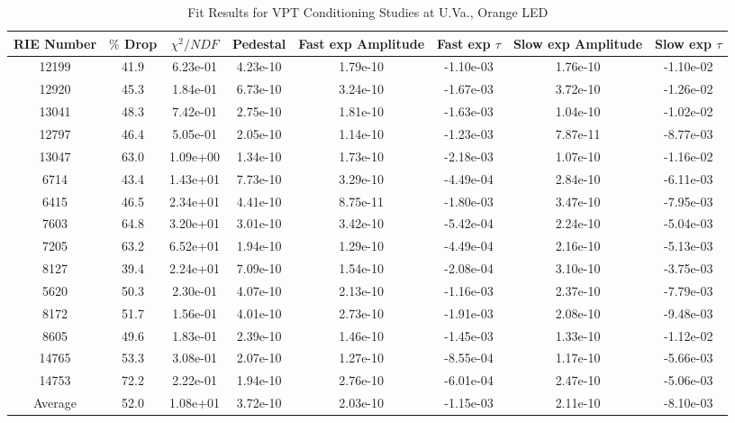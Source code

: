 \begin{table}[ht] 
\begin{adjustwidth}{-1.7in}{-1.7in} 
  \centering 
  \noindent 
  \small 
    \caption{Fit Results for VPT Conditioning Studies at U.Va., Orange LED} 
    \label{tab:UVaRig_orange} 
    \begin{tabular}{|c|c|c|c|c|c|c|c|} \hline 
RIE Number & $\%$ Drop & $\chi^2/NDF$ & Pedestal & Fast exp Amplitude &  Fast exp $\tau$  & Slow exp Amplitude &  Slow exp $\tau$   \\ \hline 
 
12199  & 41.9 & 6.23e-01 & 4.23e-10 & 1.79e-10 & -1.10e-03 & 1.76e-10 & -1.10e-02\\ \hline 
12920  & 45.3 & 1.84e-01 & 6.73e-10 & 3.24e-10 & -1.67e-03 & 3.72e-10 & -1.26e-02\\ \hline 
13041  & 48.3 & 7.42e-01 & 2.75e-10 & 1.81e-10 & -1.63e-03 & 1.04e-10 & -1.02e-02\\ \hline 
12797  & 46.4 & 5.05e-01 & 2.05e-10 & 1.14e-10 & -1.23e-03 & 7.87e-11 & -8.77e-03\\ \hline 
13047  & 63.0 & 1.09e+00 & 1.34e-10 & 1.73e-10 & -2.18e-03 & 1.07e-10 & -1.16e-02\\ \hline 
6714  & 43.4 & 1.43e+01 & 7.73e-10 & 3.29e-10 & -4.49e-04 & 2.84e-10 & -6.11e-03\\ \hline 
6415  & 46.5 & 2.34e+01 & 4.41e-10 & 8.75e-11 & -1.80e-03 & 3.47e-10 & -7.95e-03\\ \hline 
7603  & 64.8 & 3.20e+01 & 3.01e-10 & 3.42e-10 & -5.42e-04 & 2.24e-10 & -5.04e-03\\ \hline 
7205  & 63.2 & 6.52e+01 & 1.94e-10 & 1.29e-10 & -4.49e-04 & 2.16e-10 & -5.13e-03\\ \hline 
8127  & 39.4 & 2.24e+01 & 7.09e-10 & 1.54e-10 & -2.08e-04 & 3.10e-10 & -3.75e-03\\ \hline 
5620  & 50.3 & 2.30e-01 & 4.07e-10 & 2.13e-10 & -1.16e-03 & 2.37e-10 & -7.79e-03\\ \hline 
8172  & 51.7 & 1.56e-01 & 4.01e-10 & 2.73e-10 & -1.91e-03 & 2.08e-10 & -9.48e-03\\ \hline 
8605  & 49.6 & 1.83e-01 & 2.39e-10 & 1.46e-10 & -1.45e-03 & 1.33e-10 & -1.12e-02\\ \hline 
14765  & 53.3 & 3.08e-01 & 2.07e-10 & 1.27e-10 & -8.55e-04 & 1.17e-10 & -5.66e-03\\ \hline 
14753  & 72.2 & 2.22e-01 & 1.94e-10 & 2.76e-10 & -6.01e-04 & 2.47e-10 & -5.06e-03\\ \hline 
Average  & 52.0 & 1.08e+01 & 3.72e-10 & 2.03e-10 & -1.15e-03 & 2.11e-10 & -8.10e-03 \\ \hline 
    \end{tabular} 
  \end{adjustwidth} 
\end{table} 
 

